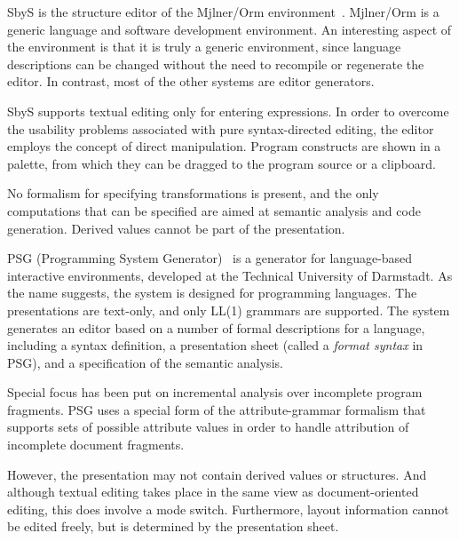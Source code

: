 \documentclass{speauth}
\begin{document}

SbyS is the structure editor of the Mj\slasho lner/Orm environment~\cite{magnusson90orm}. Mj\slasho lner/Orm is a generic language and software development environment. An interesting aspect of the environment is that it is truly a generic environment, since language descriptions can be changed without the need to recompile or regenerate the editor. In contrast, most of the other systems are editor generators.

SbyS supports textual editing only for entering expressions. In order to overcome the usability problems associated with pure syntax-directed editing, the editor employs the concept of direct manipulation. Program constructs are shown in a palette, from which they can be dragged to the program source or a clipboard.

No formalism for specifying transformations is present, and the only computations that can be specified are aimed at semantic analysis and code generation. Derived values cannot be part of the presentation.



PSG (Programming System Generator)~\cite{Bahlke86PSG} is a generator for language-based interactive environments, developed at the Technical University of Darmstadt. As the name suggests, the system is designed for programming languages. The presentations are text-only, and only LL(1) grammars are supported. The system generates an editor based on a number of formal descriptions for a language, including a syntax definition, a presentation sheet (called a {\em format syntax} in PSG), and a specification of the semantic analysis.

Special focus has been put on incremental analysis over incomplete program fragments. PSG uses a special form of the attribute-grammar formalism that supports sets of possible attribute values in order to handle attribution of incomplete document fragments.

However, the presentation may not contain derived values or structures. And although textual editing takes place in the same view as document-oriented editing, this does involve a mode switch. Furthermore, layout information cannot be edited freely, but is determined by the presentation sheet.

\end{document}

